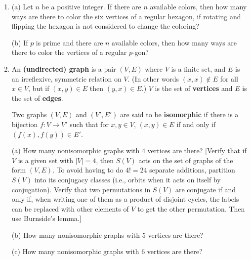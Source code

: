 \documentclass[leqno]{book}
\begin{document}
\begin{enumerate}
\item (a) Let $n$ be a positive integer.  If there are $n$ available colors, then how many ways are there to color the six vertices of a regular hexagon, if rotating and flipping the hexagon is not considered to change the coloring?

(b) If $p$ is prime and there are $n$ available colors, then how many ways are there to color the vertices of a regular $p$-gon?

\item An \textbf{(undirected) graph} is a pair $(V,E)$ where $V$ is a finite set, and $E$ is an irreflexive, symmetric relation on $V$.  (In other words $(x,x)\notin E$ for all $x\in V$, but if $(x,y)\in E$ then $(y,x)\in E$.)  $V$ is the set of \textbf{vertices} and $E$ is the set of \textbf{edges}.

Two graphs $(V,E)$ and $(V',E')$ are said to be \textbf{isomorphic} if there is a bijection $f:V\to V'$ such that for $x,y\in V$, $(x,y)\in E$ if and only if $(f(x),f(y))\in E'$.

(a) How many nonisomorphic graphs with $4$ vertices are there?  [Verify that if $V$ is a given set with $|V|=4$, then $S(V)$ acts on the set of graphs of the form $(V,E)$.  To avoid having to do $4!=24$ separate additions, partition $S(V)$ into its conjugacy classes (i.e., orbits when it acts on itself by conjugation).  Verify that two permutations in $S(V)$ are conjugate if and only if, when writing one of them as a product of disjoint cycles, the labels can be replaced with other elements of $V$ to get the other permutation.  Then use Burnside's lemma.]

(b) How many nonisomorphic graphs with $5$ vertices are there?

(c) How many nonisomorphic graphs with $6$ vertices are there?

\end{enumerate}
\end{document}
